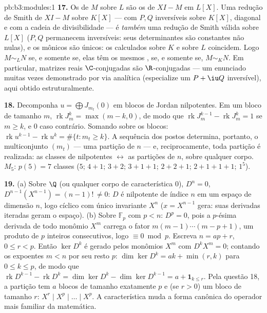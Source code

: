 \begin{solution}{pb:b3:modules:1}
\textbf{17.} Os  de $M$ sobre $L$ são os
 de $XI - M$ em $L[X]$. Uma redução de Smith
de $XI - M$ sobre $K[X]$ --- com $P, Q$ inversíveis sobre
$K[X]$, diagonal e com a cadeia de divisibilidade --- é
\emph{também} uma redução de Smith válida sobre $L[X]$ ($P, Q$
permanecem inversíveis: seus determinantes são constantes não nulas), e
os  mônicos são únicos: os 
calculados sobre $K$ e sobre $L$ coincidem. Logo $M \sim_L N$ se, e
somente se, elas têm os mesmos , se, e somente se,
$M \sim_K N$. Em particular, matrizes reais $\C$-conjugadas são
$\R$-conjugadas --- um enunciado muitas vezes demonstrado por via
analítica (especialize um $P + \iu
Q$ inversível), aqui obtido
estruturalmente.

\textbf{18.} Decomponha $u = \bigoplus J_{m_t}(0)$ em blocos de Jordan nilpotentes. Em um
bloco de tamanho $m$, $\operatorname{rk}J_m^k = \max(m - k, 0)$, de modo que $\operatorname{rk}J_m^{k-1} - \operatorname{rk}J_m^k = 1$ se $m
\geq k$, e $0$
caso contrário. Somando sobre os blocos: $\operatorname{rk}u^{k-1} - \operatorname{rk}u^k =
\#\{t : m_t \geq k\}$. A sequência dos postos
determina, portanto, o multiconjunto $(m_t)$ --- uma partição de
$n$ --- e, reciprocamente, toda partição é realizada: as classes de
nilpotentes $\leftrightarrow$ as partições de $n$, sobre qualquer corpo. $M_5$:
$p(5) = 7$ classes ($5$; $4{+}1$; $3{+}2$; $3{+}1{+}1$; $2{+}2{+}1$; $2{+}1{+}1{+}1$;
$1^5$).

\textbf{19.} (a) Sobre $\Q$ (ou qualquer corpo de característica
$0$), $D^n = 0$, $D^{n-1}(X^{n-1}) = (n-1)!\, \neq 0$: $D$ é nilpotente de índice $n$ em um
espaço de dimensão $n$, logo cíclico com único invariante $X^n$
($x = X^{n-1}$ gera: suas derivadas iteradas geram o espaço). (b) Sobre $\mathbb F_p$ com
$p
< n$: $D^p = 0$, pois a $p$-ésima derivada de todo monômio
$X^m$ carrega o fator $m(m-1)\cdots(m-p+1)$, um produto de $p$ inteiros
consecutivos, logo $\equiv 0 \bmod p$. Escreva $n = ap + r$, $0 \leq r < p$. Então $\ker D^k$ é gerado pelos
monômios $X^m$ com $D^kX^m = 0$; contando os expoentes $m < n$ por seu
resto  $p$: $\dim\ker D^k = ak + \min(r,
k)$ para $0 \leq k \leq p$, de modo que $\operatorname{rk}D^{k-1} -
\operatorname{rk}D^k = \dim\ker D^k - \dim\ker D^{k-1} = a +
\mathbf 1_{k \leq r}$. Pela questão
18, a partição tem $a$ blocos de tamanho exatamente $p$ e (se
$r > 0$) um bloco de tamanho $r$: 
$X^r \mid X^p \mid \dots \mid X^p$. A característica muda a forma canônica do operador mais familiar
da matemática.


\end{solution}
